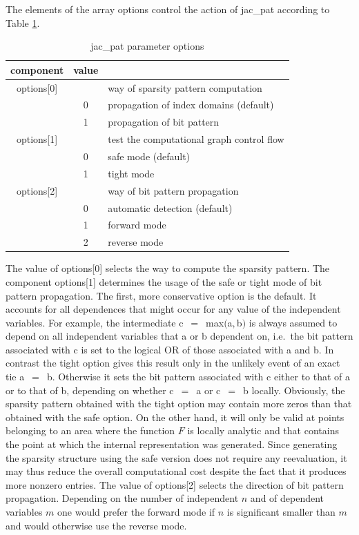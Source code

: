 \documentclass[11pt,twoside]{article}
\begin{document}
The elements of the array {\sf options} control the action of 
{\sf jac\_pat} according to Table \ref{options}.
\begin{table}[h]
\center
\begin{tabular}{|c|c|l|} \hline
component & value &  \\ \hline
{\sf options[0]} &    &  way of sparsity pattern computation \\
                 & 0  &  propagation of index domains (default) \\
                 & 1  &  propagation of bit pattern \\ \hline
{\sf options[1]} &    &  test the computational graph control flow \\
                 & 0  &  safe mode (default) \\
                 & 1  &  tight mode \\ \hline
{\sf options[2]} &    &  way of bit pattern propagation \\
                 & 0  &  automatic detection (default) \\
                 & 1  &  forward mode \\ 
                 & 2  &  reverse mode \\ \hline
\end{tabular}
\caption{ {\sf jac\_pat} parameter {\sf options}\label{options}}
\end{table}           
The value of {\sf options[0]} selects the way to compute the sparsity
pattern. The component {\sf options[1]} determines
the usage of the safe or tight mode of bit pattern propagation.
The first, more conservative option is the default. It accounts for all 
dependences that might occur for any value of the
independent variables. For example, the intermediate 
{\sf c}~$=$~{\sf max}$(${\sf a}$,${\sf b}$)$ is
always assumed to depend on all independent variables that {\sf a} or {\sf b}
dependent on, i.e.\ the bit pattern associated with {\sf c} is set to the
logical {\sf OR} of those associated with {\sf a} and {\sf b}. 
In contrast
the tight option gives this result only in the unlikely event of an exact
tie {\sf a}~$=$~{\sf b}. Otherwise it sets the bit pattern
associated with {\sf c} either to that of {\sf a} or to that of {\sf b},
depending on whether {\sf c}~$=$~{\sf a} or {\sf c}~$=$~{\sf b} locally.
Obviously, the sparsity pattern obtained with the tight option may contain
more zeros than that obtained with the safe option. On the other hand, it
will only be valid at points belonging to an area where the function $F$ is locally
analytic and that contains the point at which the internal representation was
generated. Since generating the sparsity structure using the safe version does not
require any reevaluation, it may thus reduce the overall computational cost 
despite the fact that it produces more nonzero entries. The value of
{\sf options[2]} selects the direction of bit pattern propagation. 
Depending on the number of independent $n$ and of dependent variables $m$ 
one would prefer the forward mode if $n$ is significant smaller than $m$ and
would otherwise use the reverse mode.
\end{document}
